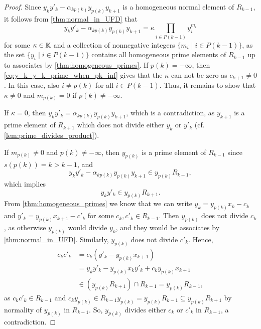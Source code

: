 \begin{proof}
	Since $y_k y'_k - \alpha_{kp(k)}y_{p(k)}y_{k+1}$ is a homogeneous normal element of $R_{k-1}$, it follows from \cref{thm:normal_in_UFD} that
	\begin{equation*}
		y_k y'_k - \alpha_{kp(k)}y_{p(k)}y_{k+1} = \kappa \prod_{i \in P(k-1)} y_i^{m_i}
	\end{equation*}
	for some $\kappa \in \mathbb{K}$ and a collection of nonnegative integers $\{m_i \mid i \in
		P(k-1)\}$, as the set $\{y_i \mid i \in P(k-1)\}$ contains all homogeneous prime
	elements of $R_{k-1}$ up to associates by \cref{thm:homogeneous_primes}. If $p(k) =
		-\infty$, then \cref{eq:y_k_y_k_prime_when_pk_inf} gives that the $\kappa$ can not be
	zero as $c_{k+1} \neq 0$. In this case, also $i \neq p(k)$ for all $i \in P(k-1)$.
	Thus, it remains to show that $\kappa \neq 0$ and $m_{p(k)} = 0$ if $p(k) \neq -
		\infty$.

	If $\kappa = 0$, then $y_k y'_k = \alpha_{kp(k)}y_{p(k)}y_{k+1}$, which is a
	contradiction, as $y_{k+1}$ is a prime element of $R_{k+1}$ which does not divide
	either $y_k$ or $y'_k$ (cf. \cref{lem:prime_divides_product}).

	If $m_{p(k)} \neq 0$ and $p(k) \neq -\infty$, then $y_{p(k)}$ is a prime element of
	$R_{k-1}$ since $s(p(k)) = k > k-1$, and
	\begin{equation*}
		y_k y'_k - \alpha_{kp(k)}y_{p(k)}y_{k+1} \in y_{p(k)}R_{k-1},
	\end{equation*}
	which implies
	\begin{equation*}
		y_k y'_k \in y_{p(k)}R_{k+1}.
	\end{equation*}
	From \cref{thm:homogeneous_primes} we know that we can write $y_k = y_{p(k)}x_k - c_k$
	and $y'_k = y_{p(k)}x_{k+1} - c'_k$ for some $c_k, c'_k \in R_{k-1}$. Then $y_{p(k)}$
	does not divide $c_k$, as otherwise $y_{p(k)}$ would divide $y_k$, and they would be
	associates by \cref{thm:normal_in_UFD}. Similarly, $y_{p(k)}$ does not divide $c'_k$.
	Hence,
	\begin{align*}
		c_kc'_k & = c_k (y'_k - y_{p(k)}x_{k+1})                         \\
		        & = y_ky'_k - y_{p(k)}x_ky'_k + c_k y_{p(k)}x_{k+1}      \\
		        & \in (y_{p(k)} R_{k+1}) \cap R_{k-1} = y_{p(k)}R_{k-1},
	\end{align*}
	as $c_kc'_k \in R_{k-1}$ and $c_k y_{p(k)} \in R_{k-1}y_{p(k)} = y_{p(k)}R_{k-1}
		\subseteq y_{p(k)}R_{k+1}$ by normality of $y_{p(k)}$ in $R_{k-1}$. So, $y_{p(k)}$
	divides either $c_k$ or $c'_k$ in $R_{k-1}$, a contradiction.
\end{proof}

